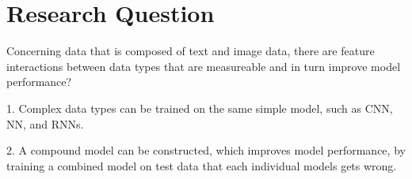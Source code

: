 \section{Research Question}


Concerning data that is composed of text and image data, there are feature interactions between data types that are measureable and in turn improve model performance?

1. Complex data types can be trained on the same simple model, such as CNN, NN, and RNNs.

2. A compound model can be constructed, which improves model performance, by training a combined model on test data that each individual models gets wrong.





